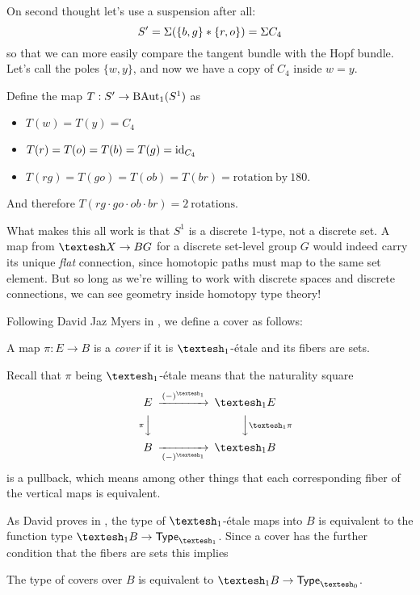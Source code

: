 \documentclass[12pt]{article}
\begin{document}
On second thought let's use a suspension after all:
\[ 
S'=\Sigma (\{b, g\}*\{r, o\}) =\Sigma C_4
\] so that we can more easily compare the tangent bundle with the Hopf bundle. Let's call the poles \( \{w, y\} \), and now we have a copy of \( C_4 \) inside \( w=y \). 

Define the map \( T:S'\to\mathrm{BAut}_1(S^1) \) as
\begin{itemize}
\item \( T(w)=T(y)=C_4 \)
\item \( T(r)=T(o)=T(b)=T(g)=\text{id}_{C_4} \)
\item \( T(rg)=T(go)=T(ob)=T(br)=\mathrm{rotation\ by\ 180} \).
\end{itemize} 
And therefore \( T(rg\cdot go\cdot ob\cdot br)=\mathrm{2\ rotations} \).



What makes this all work is that \( S^1 \) is a discrete 1-type, not a discrete set. A map from \( \shape X\to BG \) for a discrete set-level group \( G \) would indeed carry its unique \emph{flat} connection, since homotopic paths must map to the same set element. But so long as we're willing to work with discrete spaces and discrete connections, we can see geometry inside homotopy type theory!

Following David Jaz Myers in \cite{myersgood}, we define a cover as follows:

\begin{mydef}
  A map \(\pi:E\to B\) is a \emph{cover} if it is \(\shapeo\)-étale and its fibers are sets.
\end{mydef}

Recall that \(\pi\) being \(\shapeo\)-étale means that the naturality square 
\[
\begin{CD}
E @>(-)^{\shapeo}>> \shapeo E \\
@V{\pi}VV @VV{\shapeo \pi}V \\
B @>>(-)^{\shapeo}> \shapeo B
\end{CD}
\]
is a pullback, which means among other things that each corresponding fiber of the vertical maps is equivalent.

As David proves in \cite{myersgood}, the type of \(\shapeo\)-étale maps into \(B\) is equivalent to the function type \(\shapeo B \to \Typeo\). Since a cover has the further condition that the fibers are sets this implies

\begin{mylemma}
  The type of covers over \(B\) is equivalent to \(\shapeo B \to \Type_{\shapez}\).
\end{mylemma}
\end{document}
